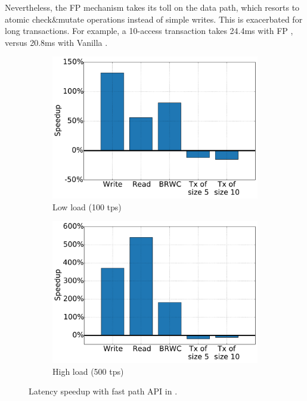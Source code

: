 Nevertheless,
the FP mechanism takes its toll on the data path, which resorts to atomic check\&mutate operations 
instead of simple writes. This is exacerbated for long transactions. 
For example, a 10-access transaction takes 24.4ms with FP \sys, 
versus 20.8ms with Vanilla \sys. 



\begin{figure}[h!]
\centering
\begin{subfigure}[t]{0.48\textwidth}
\centerline{
\includegraphics[width=.9\textwidth]{figs/low_speedup.pdf}
}
\caption{Low load (100 tps)} 
\label{fig:slowdown-low}
\end{subfigure} 
\begin{subfigure}[t]{0.48\textwidth}
\centerline{
\includegraphics[width=.9\textwidth]{figs/high_speedup.pdf}
}
\caption{High load (500 tps)} 
\label{fig:slowdown-high}
\end{subfigure} 
\caption{Latency speedup with  fast path API in {\sys}.}
\label{fig:fp-tradeoff}
\end{figure}




